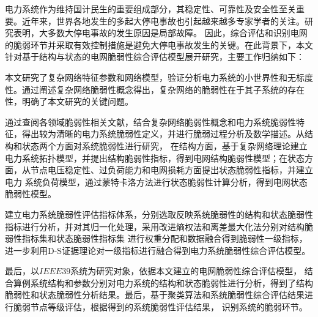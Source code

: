\begin{cabstract}
电力系统作为维持国计民生的重要组成部分，其稳定性、可靠性及安全性至关重要。近年来，世界各地发生的多起大停电事故也引起越来越多专家学者的关注。研究表明，大多数大停电事故的发生原因是局部故障。
因此，综合评估和识别电网的脆弱环节并采取有效控制措施是避免大停电事故发生的关键。在此背景下，本文针对基于结构与状态的电网脆弱性综合评估模型展开研究，主要工作归纳如下：


本文研究了复杂网络特征参数和网络模型，验证分析电力系统的小世界性和无标度性。通过阐述复杂网络脆弱性概念得出，复杂网络的脆弱性在于其子系统的存在性，明确了本文研究的关键问题。

通过查阅各领域脆弱性相关文献，结合复杂网络脆弱性概念和电力系统脆弱性特征，得出较为清晰的电力系统脆弱性定义，并进行脆弱过程分析及数学描述。从结构和状态两个方面对系统脆弱性进行研究，
在结构方面，基于复杂网络理论建立电力系统拓扑模型，并提出结构脆弱性指标，得到电网结构脆弱性模型；在状态方面，从节点电压稳定性、过负荷能力和电网损耗方面提出状态脆弱性指标，并建立电力
系统负荷模型，通过蒙特卡洛方法进行状态脆弱性计算分析，得到电网状态脆弱性模型。

建立电力系统脆弱性评估指标体系，分别选取反映系统脆弱性的结构和状态脆弱性指标进行分析，并对其归一化处理，采用改进熵权法和离差最大化法分别对结构脆弱性指标集和状态脆弱性指标集
进行权重分配和数据融合得到脆弱性一级指标，进一步利用D-S证据理论对一级指标进行融合得到电力系统脆弱性综合评估模型。

最后，以$IEEE39$系统为研究对象，依据本文建立的电网脆弱性综合评估模型，
结合算例系统结构和参数分别对电力系统的结构和状态脆弱性进行分析，得到了结构脆弱性和状态脆弱性分析结果。最后，基于聚类算法和系统脆弱性综合评估结果进行脆弱节点等级评估，根据得到的系统脆弱性评估结果，
识别系统的脆弱环节。
\end{cabstract}


\begin{eabstract}

\end{eabstract}

\ekeywords{} 
